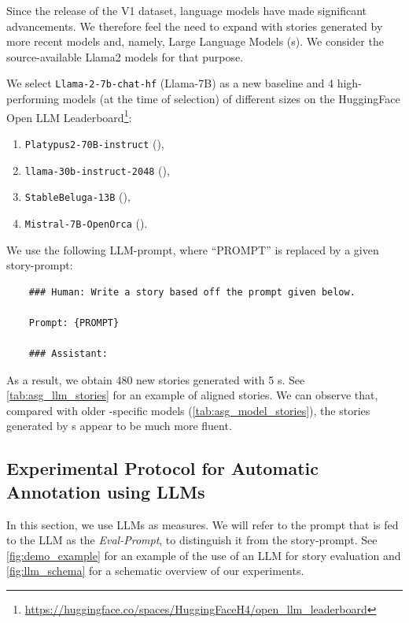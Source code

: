 Since the release of the {\hanna} V1 dataset, language models have made significant advancements. We therefore feel the need to expand {\hanna} with stories generated by more recent models and, namely, Large Language Models ({\llm}s). We consider the source-available Llama2 models \citep{touvron2023llama2} for that purpose.

We select \texttt{Llama-2-7b-chat-hf} (Llama-7B) as a new baseline and 4 high-performing models (at the time of selection) of different sizes on the HuggingFace Open LLM Leaderboard\footnote{\url{https://huggingface.co/spaces/HuggingFaceH4/open_llm_leaderboard}}: 

\begin{enumerate}[noitemsep]
    \item \texttt{Platypus2-70B-instruct} (\platypus),
    \item \texttt{llama-30b-instruct-2048} (\llamalarge),
    \item \texttt{StableBeluga-13B} (\beluga),
    \item \texttt{Mistral-7B-OpenOrca} (\mistral).
\end{enumerate}

We use the following LLM-prompt, where ``PROMPT'' is replaced by a given story-prompt:

\begin{verbatim}
    ### Human: Write a story based off the prompt given below.
    
    Prompt: {PROMPT}
    
    ### Assistant:
\end{verbatim}

As a result, we obtain 480 new stories generated with 5 {\llmfull}s. See \autoref{tab:asg_llm_stories} for an example of aligned stories. We can observe that, compared with older {\asg}-specific models (\autoref{tab:asg_model_stories}), the stories generated by {\llm}s appear to be much more fluent. 

\subsection{Experimental Protocol for Automatic Annotation using LLMs}
\label{sub:llm_methodology_ase}

In this section, we use LLMs as {\asefull} measures. We will refer to the prompt that is fed to the LLM as the \textit{Eval-Prompt}, to distinguish it from the story-prompt. See \autoref{fig:demo_example} for an example of the use of an LLM for story evaluation and \autoref{fig:llm_schema} for a schematic overview of our experiments.

